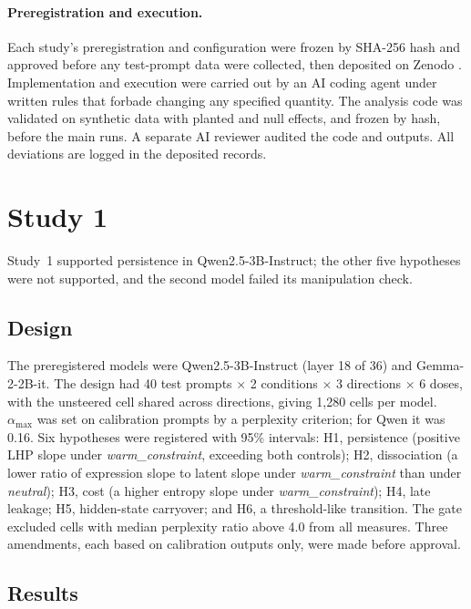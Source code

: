 \documentclass[11pt]{article}
\newcommand{\amax}{\alpha_{\max}}
\newcommand{\warm}{\textit{warm\_constraint}}
\newcommand{\neutral}{\textit{neutral}}
\begin{document}
\paragraph{Preregistration and execution.} Each study's preregistration and configuration were frozen by SHA-256 hash and approved before any test-prompt data were collected, then deposited on Zenodo \citep{su2026prereg1,su2026prereg2}. Implementation and execution were carried out by an AI coding agent under written rules that forbade changing any specified quantity. The analysis code was validated on synthetic data with planted and null effects, and frozen by hash, before the main runs. A separate AI reviewer audited the code and outputs. All deviations are logged in the deposited records.

\section{Study 1}\label{sec:study1}

Study~1 supported persistence in Qwen2.5-3B-Instruct; the other five hypotheses were not supported, and the second model failed its manipulation check.

\subsection{Design}

The preregistered models were Qwen2.5-3B-Instruct (layer 18 of 36) and Gemma-2-2B-it. The design had 40 test prompts $\times$ 2 conditions $\times$ 3 directions $\times$ 6 doses, with the unsteered cell shared across directions, giving 1{,}280 cells per model. $\amax$ was set on calibration prompts by a perplexity criterion; for Qwen it was 0.16. Six hypotheses were registered with 95\% intervals: H1, persistence (positive LHP slope under \warm{}, exceeding both controls); H2, dissociation (a lower ratio of expression slope to latent slope under \warm{} than under \neutral{}); H3, cost (a higher entropy slope under \warm{}); H4, late leakage; H5, hidden-state carryover; and H6, a threshold-like transition. The gate excluded cells with median perplexity ratio above 4.0 from all measures. Three amendments, each based on calibration outputs only, were made before approval.

\subsection{Results}
\end{document}
